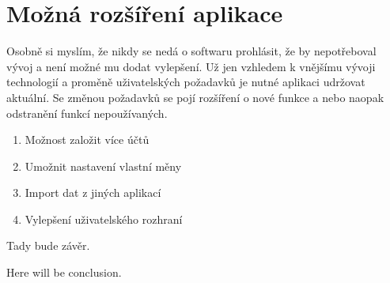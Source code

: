 \documentclass[
  biblatex,
  figures=true,
  tables=false,
  glossaries,
  index
]{kidiplom}
\begin{document}
\section{Možná rozšíření aplikace}
Osobně si myslím, že nikdy se nedá o softwaru prohlásit, že by nepotřeboval vývoj a není možné mu dodat vylepšení. Už jen vzhledem k vnějšímu vývoji technologií a proměně uživatelských požadavků je nutné aplikaci udržovat aktuální. Se změnou požadavků se pojí rozšíření o nové funkce a nebo naopak odstranění funkcí nepoužívaných.

\begin{enumerate}
  \item Možnost založit více účtů
  \item Umožnit nastavení vlastní měny
  \item Import dat z jiných aplikací
  \item Vylepšení uživatelského rozhraní
\end{enumerate}

\begin{kiconclusions}
Tady bude závěr.
\end{kiconclusions}

\begin{kiconclusions}[english]
Here will be conclusion.
\end{kiconclusions}







\printbibliography
\nocite{*}


\end{document}
